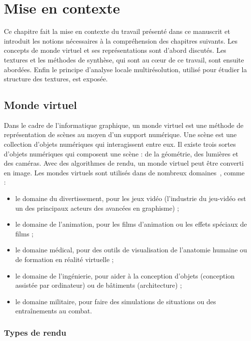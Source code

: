 \chapter{Mise en contexte}
\label{ch:chapitre0}

Ce chapitre fait la mise en contexte du travail présenté dans ce manuscrit et introduit les notions nécessaires à la compréhension des chapitres suivants. Les concepts de monde virtuel et ses représentations sont d'abord discutés. Les textures et les méthodes de synthèse, qui sont au cœur de ce travail, sont ensuite abordées. Enfin le principe d'analyse locale multirésolution, utilisé pour étudier la structure des textures, est exposée.

\section{Monde virtuel}

Dans le cadre de l'informatique graphique, un monde virtuel est une méthode de représentation de scènes au moyen d'un support numérique. Une scène est une collection d'objets numériques qui interagissent entre eux. Il existe trois sortes d'objets numériques qui composent une scène : de la géométrie, des lumières et des caméras. Avec des algorithmes de rendu, un monde virtuel peut être converti en image. Les mondes virtuels sont utilisés dans de nombreux domaines~\cite{magnenat-thalmann_introduction_1986}, comme :

\begin{itemize}
    \item le domaine du divertissement, pour les jeux vidéo (l'industrie du jeu-vidéo est un des principaux acteurs des avancées en graphisme) ;
    \item le domaine de l'animation, pour les films d'animation ou les effets spéciaux de films ;
    \item le domaine médical, pour des outils de visualisation de l'anatomie humaine ou de formation en réalité virtuelle ;
    \item le domaine de l'ingénierie, pour aider à la conception d'objets (conception assistée par ordinateur) ou de bâtiments (architecture) ;
    \item le domaine militaire, pour faire des simulations de situations ou des entraînements au combat.
\end{itemize}

\subsection{Types de rendu}

